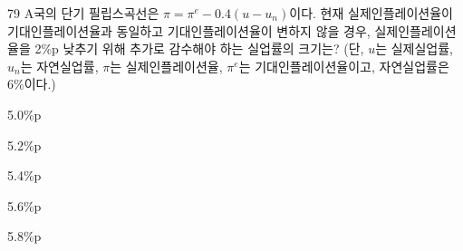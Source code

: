 \begin{question}{79}
A국의 단기 필립스곡선은 $\pi =\pi^{e}-0.4(u-u_{n})$이다. 현재 실제인플레이션율이 기대인플레이션율과 동일하고 기대인플레이션율이 변하지 않을 경우, 실제인플레이션율을 2\%p 낮추기 위해 추가로 감수해야 하는 실업률의 크기는? (단, $u$는 실제실업률, $u_{n}$는 자연실업률, $\pi$는 실제인플레이션율, $\pi^{e}$는 기대인플레이션율이고, 자연실업률은 6\%이다.)
\begin{choices}
  \item 5.0\%p
  \item 5.2\%p
  \item 5.4\%p
  \item 5.6\%p
  \item 5.8\%p
\end{choices}
\end{question}
